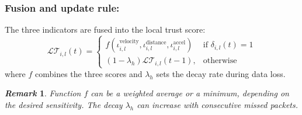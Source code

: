 \documentclass{ifacconf}
\def\LT{\mathcal{LT}} %
\newtheorem{remark}{\it \textbf{Remark}}%
\begin{document}
\subsubsection{Fusion and update rule:}
The three indicators are fused into the local trust score:
\begin{equation}
    \LT_{i,l}(t) = 
    \left\{ \begin{array}{lc}
        f (\iota_{i,l}^{\text{velocity}}, \iota_{i,l}^{\text{distance}} ,\iota_{i,l}^{\text{accel}})  &  \text{if } \delta_{i,l}(t) = 1 \\
        (1 - \lambda_h)\LT_{i,l}(t-1), & \text{otherwise}
    \end{array}\right.
\end{equation}
where $f$ combines the three scores and $\lambda_h$ sets the decay rate during data loss.
\begin{remark}
    Function $f$ can be a weighted average or a minimum, depending on the desired sensitivity. The decay $\lambda_h$ can increase with consecutive missed packets.
\end{remark}
\end{document}
